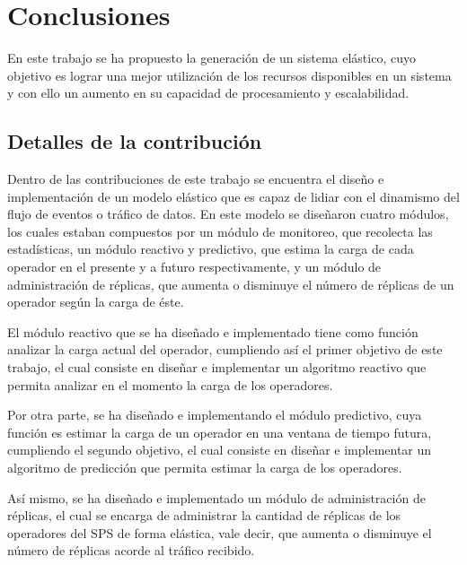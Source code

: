 \chapter{Conclusiones}
\label{cap:conclusiones}
En este trabajo se ha propuesto la generación de un sistema elástico, cuyo objetivo es lograr una mejor utilización de los recursos disponibles \normalsize{en un sistema} y con ello un aumento en su capacidad de procesamiento y escalabilidad.

\section{Detalles de la contribución}
Dentro de las contribuciones de este trabajo se encuentra el diseño e implementación de un modelo elástico que es capaz de lidiar con el dinamismo del flujo de eventos o tráfico de datos. En este modelo se diseñaron cuatro módulos, los cuales estaban compuestos por un módulo de monitoreo, que recolecta las estadísticas, un módulo reactivo y predictivo, que estima la carga de cada operador en el presente y a futuro respectivamente, y un módulo de administración de réplicas, que aumenta o disminuye el número de réplicas de un operador según la carga de éste.

El módulo reactivo que se ha diseñado e implementado tiene como función analizar la carga actual del operador, cumpliendo así el primer objetivo de este trabajo, el cual consiste en dise\~nar e implementar un algoritmo reactivo que permita analizar en el momento la carga de los operadores.

Por otra parte, se ha diseñado e implementando el módulo predictivo, cuya función es estimar la carga de un operador en una ventana de tiempo futura, cumpliendo el segundo objetivo, el cual consiste en dise\~nar e implementar un algoritmo de predicci\'on que permita estimar la carga de los operadores.

Así mismo, se ha diseñado e implementado un módulo de administración de réplicas, el cual se encarga de administrar la cantidad de réplicas de los operadores del SPS de forma elástica, vale decir, que aumenta o disminuye el número de réplicas acorde al tráfico recibido.


